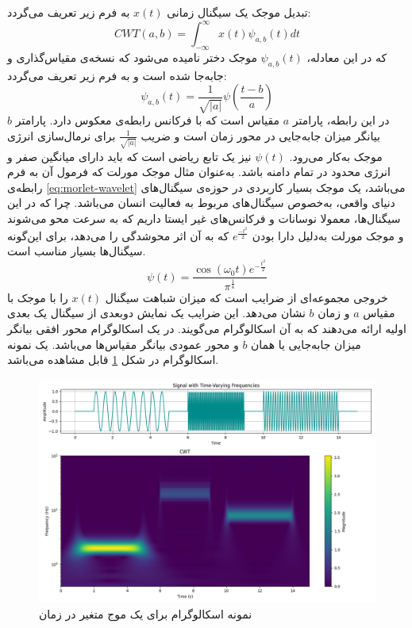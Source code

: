 تبدیل موجک یک سیگنال زمانی $x(t)$
به فرم زیر تعریف می‌گردد:
\begin{equation}
    \label{eq:wavelet-transform}
    CWT(a, b) = \int_{-\infty}^{\infty} x(t) \psi_{a,b}(t) dt
\end{equation}
که در این معادله، $\psi_{a,b}(t)$
موجک دختر
نامیده می‌شود که نسخه‌ی مقیاس‌گذاری و جابه‌جا شده است و به فرم زیر تعریف می‌گردد:
\begin{equation}
    \label{eq:daughter-wavelet}
    \psi_{a,b}(t) = \frac{1}{\sqrt{|a|}} \psi \left( \frac{t - b}{a} \right)
\end{equation}
در این رابطه، پارامتر $a$ مقیاس است
که با فرکانس رابطه‌ی معکوس دارد. پارامتر $b$
بیانگر میزان جابه‌جایی در محور زمان است و ضریب
$\frac{1}{\sqrt{|a|}}$
برای نرمال‌سازی انرژی موجک به‌کار می‌رود.
$\psi(t)$
نیز یک تابع ریاضی است که باید دارای میانگین صفر و انرژی محدود در تمام دامنه باشد. به‌عنوان مثال موجک مورلت
که فرمول آن به فرم رابطه‌ی \ref{eq:morlet-wavelet}
می‌باشد، یک موجک بسیار کاربردی در حوزه‌ی سیگنال‌های دنیای واقعی، به‌خصوص سیگنال‌های مربوط به فعالیت انسان می‌باشد. چرا که در این سیگنال‌ها، معمولا نوسانات و فرکانس‌های غیر ایستا داریم که به سرعت محو می‌شوند و موجک مورلت به‌دلیل دارا بودن $e^{\frac{-t^2}{2}}$
که به آن اثر محوشدگی را می‌دهد، برای این‌گونه سیگنال‌ها بسیار مناسب است.
\begin{equation}
    \label{eq:morlet-wavelet}
    \psi(t) = \frac{\cos(\omega_0 t) e^{-\frac{t^2}{2}}}{\pi^{\frac{1}{4}}}
\end{equation}
خروجی 
مجموعه‌ای از ضرایب است که میزان شباهت سیگنال $x(t)$
را با موجک با مقیاس $a$ و زمان $b$
نشان می‌دهد. این ضرایب یک نمایش دوبعدی از سیگنال یک بعدی اولیه ارائه می‌دهند که به آن اسکالوگرام می‌گویند. در یک اسکالوگرام محور افقی بیانگر میزان جابه‌جایی یا همان $b$ و
محور عمودی بیانگر مقیاس‌ها می‌باشد. یک نمونه اسکالوگرام در شکل \ref{fig:wavelet-plot} قابل مشاهده می‌باشد.
\begin{figure}[htb!]
\centering
\includegraphics[width=1\textwidth]{Images/Chapter3/wavelet-plot.png}
\caption{نمونه اسکالوگرام برای یک موج متغیر در زمان}
\label{fig:wavelet-plot}
\end{figure}

